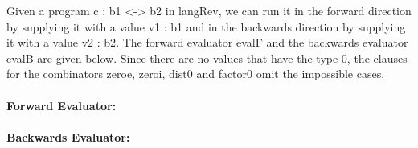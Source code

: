 \documentclass{llncs}
\begin{document}
\begin{definition}
\label{def:operational-langRev}
Given a program {{c : b1 <-> b2}} in {{langRev}}, we can run it in the
forward direction by supplying it with a value {{ v1 : b1 }} and in
the backwards direction by supplying it with a value {{v2 : b2}}. The
forward evaluator {{evalF}} and the backwards evaluator {{evalB}} are
given below. Since there are no values that have the type {{0}}, the
clauses for the combinators {{zeroe}}, {{zeroi}}, {{dist0}} and
{{factor0}} omit the impossible cases.

\paragraph*{Forward Evaluator:}

  
\paragraph*{Backwards Evaluator:}


\end{definition}
\end{document}
